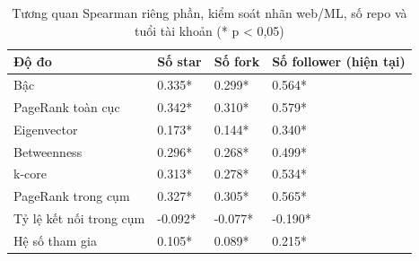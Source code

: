 \begin{table}[htbp]
\caption{Tương quan Spearman riêng phần, kiểm soát nhãn web/ML, số repo và tuổi tài khoản (* p < 0,05)}
\label{tab:rq3_partial}
\begin{tabular}{llll}
\toprule
Độ đo & Số star & Số fork & Số follower (hiện tại) \\
\midrule
Bậc & 0.335* & 0.299* & 0.564* \\
PageRank toàn cục & 0.342* & 0.310* & 0.579* \\
Eigenvector & 0.173* & 0.144* & 0.340* \\
Betweenness & 0.296* & 0.268* & 0.499* \\
k-core & 0.313* & 0.278* & 0.534* \\
PageRank trong cụm & 0.327* & 0.305* & 0.565* \\
Tỷ lệ kết nối trong cụm & -0.092* & -0.077* & -0.190* \\
Hệ số tham gia & 0.105* & 0.089* & 0.215* \\
\bottomrule
\end{tabular}
\end{table}
